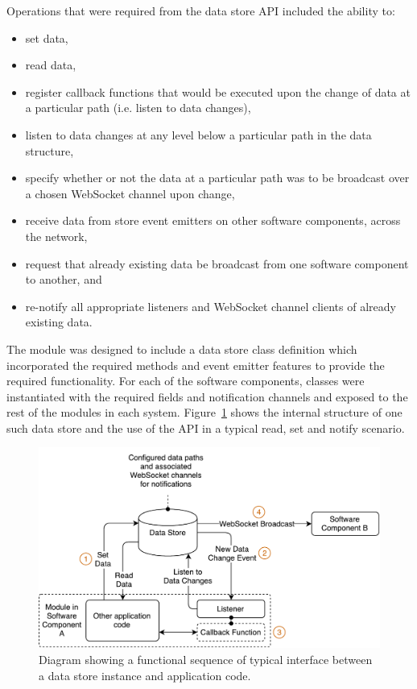         Operations that were required from the data store API included the ability to:
        \begin{itemize}
          \item set data,
          \item read data,
          \item register callback functions that would be executed upon the change of data at a particular path (i.e. listen to data changes),
          \item listen to data changes at any level below a particular path in the data structure,
          \item specify whether or not the data at a particular path was to be broadcast over a chosen WebSocket channel upon change,
          \item receive data from store event emitters on other software components, across the network,
          \item request that already existing data be broadcast from one software component to another, and
          \item re-notify all appropriate listeners and WebSocket channel clients of already existing data.
        \end{itemize}
        
        The module was designed to include a data store class definition which incorporated the required methods and event emitter features to provide the required functionality. For each of the software components, classes were instantiated with the required fields and notification channels and exposed to the rest of the modules in each system. Figure~\ref{fig:softDesign-dataStoreStructureNormal} shows the internal structure of one such data store and the use of the API in a typical read, set and notify scenario.
        
        \begin{figure}[h!]
          \centering
          \includegraphics[width=0.8\linewidth]{figures/softDesign-dataStoreStructureNormal}
          \caption[Diagram showing a functional sequence of typical interface between a data store instance and application code.]{Diagram showing a functional sequence of typical interface between a data store instance and application code.}
          \label{fig:softDesign-dataStoreStructureNormal}
        \end{figure}
        
